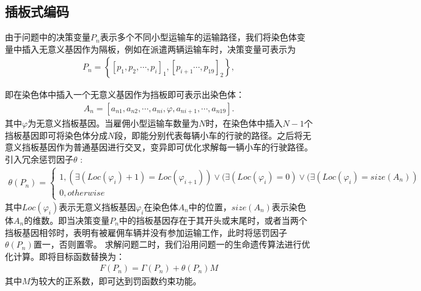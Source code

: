 \documentclass{whutmod}
\begin{document}
\begin{table}[H]
\begin{tablenotes}
     
      \subsection{插板式编码}

      由于问题中的决策变量$P_n$表示多个不同小型运输车的运输路径，我们将染色体变量中插入无意义基因作为隔板，例如在派遣两辆运输车时，决策变量可表示为
      \begin{gather*}
      P_n=\left \{[p_{1},p_{2},\cdots,p_{i}]_1,[p_{i+1}\cdots,p_{19}]_{2}\right \},
      \end{gather*}
      
      即在染色体中插入一个无意义基因作为挡板即可表示出染色体：
      \begin{gather*}
      A_n=[a_{n1},a_{n2},\cdots,a_{ni},\varphi ,a_{ni+1},\cdots,a_{n19}].
      \end{gather*}
      其中$\varphi$为无意义挡板基因。当雇佣小型运输车数量为$N$时，在染色体中插入$N-1$个挡板基因即可将染色体分成$N$段，即能分别代表每辆小车的行驶的路径。之后将无意义挡板基因作为普通基因进行交叉，变异即可优化求解每一辆小车的行驶路径。引入冗余惩罚因子$\theta$ :
      \begin{gather}
      \theta(P_n)=\left\{\begin{matrix}1,(\exists (Loc(\varphi_i )+1)=Loc(\varphi_{i+1} ))\vee  (\exists (Loc(\varphi_i )=0)\vee (\exists (Loc(\varphi_i )=size(A_n))
      \\ 0,otherwise
      \end{matrix}\right.
      \end{gather}
      其中$Loc(\varphi_i )$表示无意义挡板基因$\varphi_i$在染色体$A_n$中的位置，$size(A_n)$表示染色体$A_n$的维数。即当决策变量$P_n$中的挡板基因存在于其开头或末尾时，或者当两个挡板基因相邻时，表明有被雇佣车辆并没有参加运输工作，此时将惩罚因子$\theta(P_n)$置一，否则置零。 求解问题二时，我们沿用问题一的生命遗传算法进行优化计算。即将目标函数替换为：
      \begin{gather}
      F(P_n)= \Gamma (P_n)+\theta(P_n)M
      \end{gather}
      其中$M$为较大的正系数，即可达到罚函数约束功能。
    
    

\end{tablenotes}
\end{table}
\end{document}
